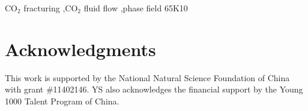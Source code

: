 \documentclass{elsarticle}
\begin{document}
\begin{frontmatter}
\begin{keyword}
CO$_2$ fracturing \sep  CO$_2$ fluid flow \sep  phase field
\MSC[2010] 65K10
\end{keyword}

\end{frontmatter}

\linenumbers






%


%
\clearpage
\appendix
%



\section*{Acknowledgments}
  This work is supported by the National Natural Science Foundation of China with grant \#11402146. YS also acknowledges the financial support by the Young 1000 Talent Program of China.


\end{document}
